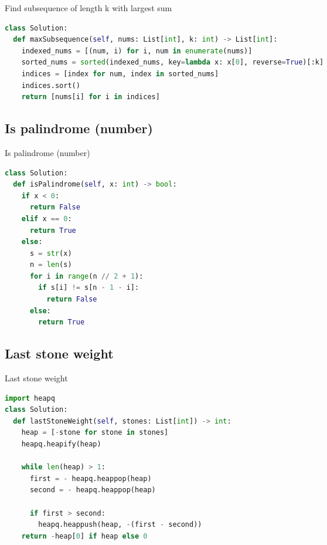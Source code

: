 \documentclass[a4paper,12pt]{article}
\begin{document}
\begin{multicols}{2}
\begin{mycode}[label={lst:find-subsequence-length-k-max-sum}]{Find subsequence of length k with largest sum}
\begin{lstlisting}[language=Python]
class Solution:
  def maxSubsequence(self, nums: List[int], k: int) -> List[int]:
    indexed_nums = [(num, i) for i, num in enumerate(nums)]
    sorted_nums = sorted(indexed_nums, key=lambda x: x[0], reverse=True)[:k]
    indices = [index for num, index in sorted_nums]
    indices.sort()
    return [nums[i] for i in indices]
\end{lstlisting}
\end{mycode}

\subsection{Is palindrome (number)}

\begin{mycode}[label={lst:is-palindrome-number}]{Is palindrome (number)}
\begin{lstlisting}[language=Python]
class Solution:
  def isPalindrome(self, x: int) -> bool:
    if x < 0:
      return False
    elif x == 0:
      return True
    else:
      s = str(x)
      n = len(s)
      for i in range(n // 2 + 1):
        if s[i] != s[n - 1 - i]:
          return False
      else:
        return True
\end{lstlisting}
\end{mycode}

\subsection{Last stone weight}

\begin{mycode}[label={lst:last-stone-weight}]{Last stone weight}
\begin{lstlisting}[language=Python]
import heapq
class Solution:
  def lastStoneWeight(self, stones: List[int]) -> int:
    heap = [-stone for stone in stones]
    heapq.heapify(heap)

    while len(heap) > 1:
      first = - heapq.heappop(heap)
      second = - heapq.heappop(heap)
      
      if first > second:
        heapq.heappush(heap, -(first - second))
    return -heap[0] if heap else 0

\end{lstlisting}
\end{mycode}


\end{multicols}
\end{document}
